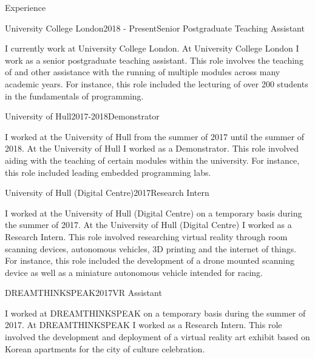 \documentclass{cv}
\begin{document}
    \begin{rSection}{Experience}
        \begin{rSubsection}{University College London}{2018 - Present}{Senior Postgraduate Teaching Assistant}{}
            \item I currently work at University College London. At University College London I work as a senior postgraduate teaching assistant. This role involves the teaching of and other assistance with the running of multiple modules across many academic years. For instance, this role included the lecturing of over 200 students in the fundamentals of programming.
        \end{rSubsection}
        
        \begin{rSubsection}{University of Hull}{2017-2018}{Demonstrator}{}
            \item I worked at the University of Hull from the summer of 2017 until the summer of 2018. At the University of Hull I worked as a Demonstrator. This role involved aiding with the teaching of certain modules within the university. For instance, this role included leading embedded programming labs.
        \end{rSubsection}
        
        \begin{rSubsection}{University of Hull (Digital Centre)}{2017}{Research Intern}{}
            \item I worked at the University of Hull (Digital Centre) on a temporary basis during the summer of 2017. At the University of Hull (Digital Centre) I worked as a Research Intern. This role involved researching virtual reality through room scanning devices, autonomous vehicles, 3D printing and the internet of things. For instance, this role included the development of a drone mounted scanning device as well as a miniature autonomous vehicle intended for racing.
        \end{rSubsection}
        
        \begin{rSubsection}{DREAMTHINKSPEAK}{2017}{VR Assistant}{}
            \item I worked at DREAMTHINKSPEAK on a temporary basis during the summer of 2017. At DREAMTHINKSPEAK I worked as a Research Intern. This role involved the development and deployment of a virtual reality art exhibit based on Korean apartments for the city of culture celebration.
        \end{rSubsection}
    \end{rSection}
    
\end{document}
